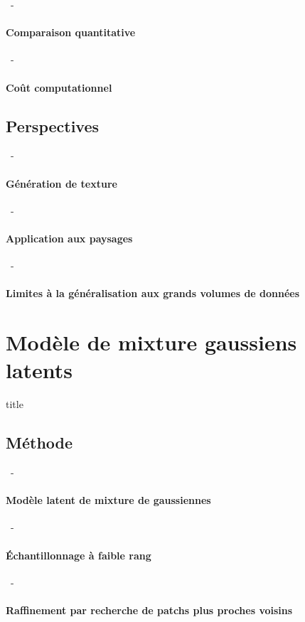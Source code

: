\documentclass[aspectratio=169, 22pt]{beamer}
\begin{document}
\begin{frame}{\secname~- \subsecname}
  \framesubtitle{Comparaison quantitative}
\end{frame}

\begin{frame}{\secname~- \subsecname}
  \framesubtitle{Coût computationnel}
\end{frame}

\subsection{Perspectives}
\begin{frame}{\secname~- \subsecname}
  \framesubtitle{Génération de texture}
\end{frame}

\begin{frame}{\secname~- \subsecname}
  \framesubtitle{Application aux paysages}
\end{frame}

\begin{frame}{\secname~- \subsecname}
  \framesubtitle{Limites à la généralisation aux grands volumes de données}
\end{frame}

\section{Modèle de mixture gaussiens latents}
\begin{frame}
  \begin{beamercolorbox}[sep=15pt,center,shadow=true,rounded=true]{title}
    \LARGE\bfseries \secname
  \end{beamercolorbox}
\end{frame}

\subsection{Méthode}
\begin{frame}{\secname~- \subsecname}
  \framesubtitle{Modèle latent de mixture de gaussiennes}
\end{frame}

\begin{frame}{\secname~- \subsecname}
  \framesubtitle{Échantillonnage à faible rang}
\end{frame}

\begin{frame}{\secname~- \subsecname}
  \framesubtitle{Raffinement par recherche de patchs plus proches voisins}
\end{frame}
\end{document}
